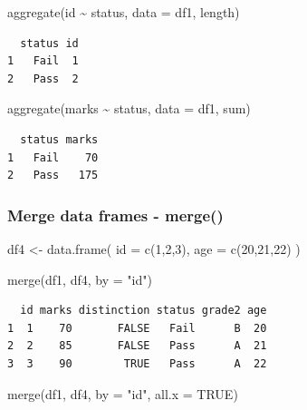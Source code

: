 \documentclass[
  letterpaper,
  DIV=11,
  numbers=noendperiod]{scrartcl}
\newenvironment{Shaded}{\begin{snugshade}}{\end{snugshade}}
\newcommand{\AttributeTok}[1]{\textcolor[rgb]{0.40,0.45,0.13}{#1}}
\newcommand{\ConstantTok}[1]{\textcolor[rgb]{0.56,0.35,0.01}{#1}}
\newcommand{\DecValTok}[1]{\textcolor[rgb]{0.68,0.00,0.00}{#1}}
\newcommand{\FunctionTok}[1]{\textcolor[rgb]{0.28,0.35,0.67}{#1}}
\newcommand{\NormalTok}[1]{\textcolor[rgb]{0.00,0.23,0.31}{#1}}
\newcommand{\OtherTok}[1]{\textcolor[rgb]{0.00,0.23,0.31}{#1}}
\newcommand{\SpecialCharTok}[1]{\textcolor[rgb]{0.37,0.37,0.37}{#1}}
\newcommand{\StringTok}[1]{\textcolor[rgb]{0.13,0.47,0.30}{#1}}
\begin{document}
\begin{Shaded}
\begin{Highlighting}[]
\FunctionTok{aggregate}\NormalTok{(id }\SpecialCharTok{\textasciitilde{}}\NormalTok{ status, }\AttributeTok{data =}\NormalTok{ df1, length)}
\end{Highlighting}
\end{Shaded}

\begin{verbatim}
  status id
1   Fail  1
2   Pass  2
\end{verbatim}

\begin{Shaded}
\begin{Highlighting}[]
\FunctionTok{aggregate}\NormalTok{(marks }\SpecialCharTok{\textasciitilde{}}\NormalTok{ status, }\AttributeTok{data =}\NormalTok{ df1, sum)}
\end{Highlighting}
\end{Shaded}

\begin{verbatim}
  status marks
1   Fail    70
2   Pass   175
\end{verbatim}

\subsubsection{Merge data frames -
merge()}\label{merge-data-frames---merge}

\begin{Shaded}
\begin{Highlighting}[]
\NormalTok{df4 }\OtherTok{\textless{}{-}} \FunctionTok{data.frame}\NormalTok{(}
  \AttributeTok{id =} \FunctionTok{c}\NormalTok{(}\DecValTok{1}\NormalTok{,}\DecValTok{2}\NormalTok{,}\DecValTok{3}\NormalTok{),}
  \AttributeTok{age =} \FunctionTok{c}\NormalTok{(}\DecValTok{20}\NormalTok{,}\DecValTok{21}\NormalTok{,}\DecValTok{22}\NormalTok{)}
\NormalTok{)}

\FunctionTok{merge}\NormalTok{(df1, df4, }\AttributeTok{by =} \StringTok{"id"}\NormalTok{)}
\end{Highlighting}
\end{Shaded}

\begin{verbatim}
  id marks distinction status grade2 age
1  1    70       FALSE   Fail      B  20
2  2    85       FALSE   Pass      A  21
3  3    90        TRUE   Pass      A  22
\end{verbatim}

\begin{Shaded}
\begin{Highlighting}[]
\FunctionTok{merge}\NormalTok{(df1, df4, }\AttributeTok{by =} \StringTok{"id"}\NormalTok{, }\AttributeTok{all.x =} \ConstantTok{TRUE}\NormalTok{)}
\end{Highlighting}
\end{Shaded}
\end{document}
